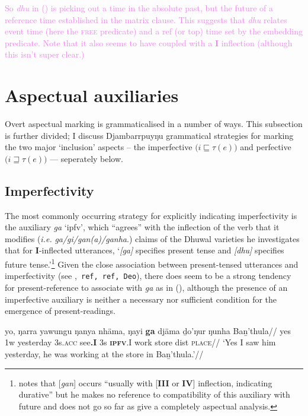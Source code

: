 \textcolor{violet}{ So \textit{dhu} in (\lastx) is picking out a time in the absolute past, but the future of a reference time established in the matrix clause. This suggests that \textit{dhu} relates event time (here the \textsc{free} predicate) and a ref (or top) time set by the embedding predicate. Note that it also seems to have coupled with a \textbf{I} inflection (although this isn't super clear.)}




\section{Aspectual auxiliaries}\label{djr-asp}

Overt aspectual marking is grammaticalised in a number of ways. This subsection is further divided; I discuss Djambarrpuyŋu grammatical strategies for marking the two major `inclusion' aspects -- the imperfective $\big(i\sqsubseteq \tau(e)\big)$ and perfective $\big(i\sqsupseteq \tau(e)\big)$ --- seperately below.

\subsection{Imperfectivity}\label{ipfvty}

 The most commonly occurring strategy for explicitly indicating imperfectivity is the auxiliary \textit{ga} `\gls{ipfv}', which ``agrees'' with the inflection of the verb that it modifies (\textit{i.e. } \textit{ga/gi/gan(a)/ganha}.) \citet[46]{Heath1980b} claims of the Dhuwal varieties he investigates that for \textbf{I}-inflected utterances, `\textit{[ga]} specifies present tense and \textit{[dhu]} specifies future tense.'\footnote{\citet[46]{Heath1980b} notes that [\textit{gan}] occurs ``usually with [\textbf{III} or \textbf{IV}] inflection, indicating durative'' but he makes no reference to compatibility of this auxiliary with future and does not go so far as give a completely aspectual analysis.} Given the close association between present-tensed utterances and imperfectivity (see \citealp[141]{Bybee1994},\texttt{ ref, ref, Deo}), there does seem to be a strong tendency for present-reference to associate with \textit{ga} as in (), although the presence of an imperfective auxiliary is neither a necessary nor sufficient condition for the emergence of present-readings.


\pex\begingl\gla yo, ŋarra yawungu ŋanya nhäma, ŋayi \textbf{ga} djäma ḏo'ŋur ŋunha Baṉ'thula//
\glb yes 1w yesterday 3s.\textsc{acc} see\textbf{.I} 3s \textsc{\textbf{ipfv}.I} work store \gls{dist} \textsc{place}//
\glft`Yes I saw him yesterday, he was working at the store in Baṉ'thula.'//\endgl\xe


